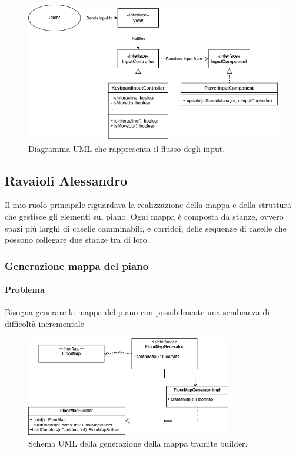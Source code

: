 \documentclass{report}
\begin{document}
\begin{figure}[H]
    \centering
    \includegraphics[width=13cm]{ObserverPattern.png}
    \caption{Diagramma UML che rappresenta il flusso degli input.}
    \label{img:ObserverPattern.png}
\end{figure}

\clearpage
\subsection{Ravaioli Alessandro}

Il mio ruolo principale riguardava la realizzazione della mappa e della struttura che gestisce gli elementi sul piano.
%
Ogni mappa è composta da stanze, ovvero spazi più larghi di caselle camminabili, e corridoi, delle sequenze di caselle che possono collegare due stanze tra di loro.
%

\subsubsection{Generazione mappa del piano}

\paragraph{Problema} Bisogna generare la mappa del piano con possibilmente una sembianza di difficoltà incrementale

\begin{figure}[H]
    \centering
    \includegraphics[width=9cm]{mapUMLdiagram.png}
    \caption{Schema UML della generazione della mappa tramite builder.}
    \label{img:mapBuilder}
\end{figure}
\end{document}
